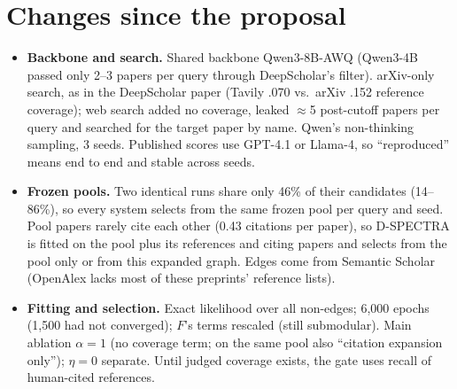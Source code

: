 \documentclass[10pt]{article}
\begin{document}
\section{Changes since the proposal}
\begin{itemize}
\item \textbf{Backbone and search.} Shared backbone Qwen3-8B-AWQ (Qwen3-4B passed only 2--3 papers per query through DeepScholar's filter). arXiv-only search, as in the DeepScholar paper (Tavily .070 vs.\ arXiv .152 reference coverage); web search added no coverage, leaked $\approx$5 post-cutoff papers per query and searched for the target paper by name. Qwen's non-thinking sampling, 3 seeds. Published scores use GPT-4.1 or Llama-4, so ``reproduced'' means end to end and stable across seeds.
\item \textbf{Frozen pools.} Two identical runs share only 46\% of their candidates (14--86\%), so every system selects from the same frozen pool per query and seed. Pool papers rarely cite each other (0.43 citations per paper), so D-SPECTRA is fitted on the pool plus its references and citing papers and selects from the pool only or from this expanded graph. Edges come from Semantic Scholar (OpenAlex lacks most of these preprints' reference lists).
\item \textbf{Fitting and selection.} Exact likelihood over all non-edges; 6,000 epochs (1,500 had not converged); $F$'s terms rescaled (still submodular). Main ablation $\alpha{=}1$ (no coverage term; on the same pool also ``citation expansion only''); $\eta{=}0$ separate. Until judged coverage exists, the gate uses recall of human-cited references.
\end{itemize}
\end{document}
